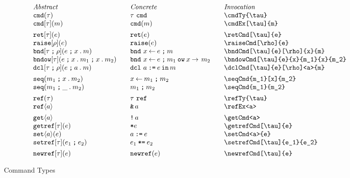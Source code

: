 \documentclass[11pt]{article}
\begin{document}
\begin{figure}

  \begin{small}
    \begin{displaymath}
      \begin{array}{l@{\qquad}l@{\qquad}l@{\qquad}l}
        \textit{Abstract} & \textit{Concrete} & \textit{Invocation} \\
        \cmdTy{\tau}               & \cmdTy*{\tau}               & \verb|\cmdTy{\tau}|               \\
        \cmdEx[\tau]{m}            & \cmdEx*{m}                  & \verb|\cmdEx[\tau]{m}|            \\[1ex]
        \retCmd[\tau]{e}           & \retCmd*{e}                 & \verb|\retCmd[\tau]{e}|           \\
        \raiseCmd[\rho]{e}         & \raiseCmd*{e}               & \verb|\raiseCmd[\rho]{e}| \\
        \bndCmd[\tau]{e}[\rho]{x}{m}           & \bndCmd*{e}{x}{m}           & \verb|\bndCmd[\tau]{e}[\rho]{x}{m}|           \\
        \bndowCmd[\tau]{e}{x}{m_1}{x}{m_2}     & \bndowCmd*{e}{x}{m_1}{x}{m_2}  & \verb|\bndowCmd[\tau]{e}{x}{m_1}{x}{m_2}| \\
        \dclCmd[\tau]{e}[\rho]<a>{m}           & \dclCmd*{e}<a>{m}           & \verb|\dclCmd[\tau]{e}[\rho]<a>{m}|           \\[1ex]
        \seqCmd{m_1}[x]{m_2}       & \seqCmd*{m_1}[x]{m_2}          & \verb|\seqCmd{m_1}[x]{m_2}| \\
        \seqCmd{m_1}{m_2}          & \seqCmd*{m_1}{m_2}          & \verb|\seqCmd{m_1}{m_2}| \\[1ex]
        \refTy{\tau}               & \refTy*{\tau}               & \verb|\refTy{\tau}| \\
        \refEx<a>                  & \refEx*<a>                 & \verb|\refEx<a>|                  \\[1ex]
        \getCmd<a>                 & \getCmd*<a>                 & \verb|\getCmd<a>|                 \\
        \getrefCmd[\tau]{e}        & \getrefCmd*{e}              & \verb|\getrefCmd[\tau]{e}|        \\
        \setCmd<a>{e}              & \setCmd*<a>{e}              & \verb|\setCmd<a>{e}|              \\
        \setrefCmd[\tau]{e_1}{e_2} & \setrefCmd*[\tau]{e_1}{e_2} & \verb|\setrefCmd[\tau]{e_1}{e_2}|  \\[1ex]
        \newrefCmd[\tau]{e}        & \newrefCmd*{e}              & \verb|\newrefCmd[\tau]{e}|
      \end{array}
    \end{displaymath}
  \end{small}

  \caption{Command Types}
  \label{fig:cmd}
\end{figure}
\end{document}
